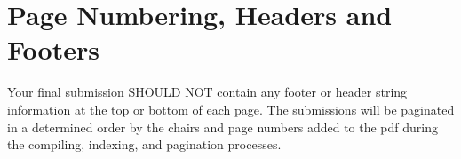 \section{Page Numbering, Headers and Footers}
                                Your final submission SHOULD NOT contain any footer or header string information 
                                at the top or bottom of each page. The submissions will be paginated in a determined 
                                order by the chairs and page numbers added to the pdf during the compiling, 
                                indexing, and pagination processes.